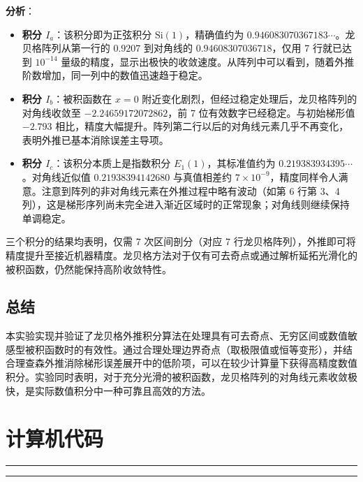 \documentclass[12pt,a4paper]{article}
\begin{document}
\textbf{分析}：
\begin{itemize}
    \item \textbf{积分 \(I_a\)}：该积分即为正弦积分 \(\mathrm{Si}(1)\)，精确值约为 \(0.946083070367183\cdots\)。龙贝格阵列从第一行的 \(0.9207\) 到对角线的 \(0.94608307036718\)，仅用 7 行就已达到 \(10^{-14}\) 量级的精度，显示出极快的收敛速度。从阵列中可以看到，随着外推阶数增加，同一列中的数值迅速趋于稳定。
    \item \textbf{积分 \(I_b\)}：被积函数在 \(x=0\) 附近变化剧烈，但经过稳定处理后，龙贝格阵列的对角线收敛至 \(-2.24659172072862\)，前 7 位有效数字已经稳定。与初始梯形值 \(-2.793\) 相比，精度大幅提升。阵列第二行以后的对角线元素几乎不再变化，表明外推已基本消除误差主导项。
    \item \textbf{积分 \(I_c\)}：该积分本质上是指数积分 \(E_1(1)\)，其标准值约为 \(0.219383934395\cdots\)。对角线近似值 \(0.21938394142680\) 与真值相差约 \(7\times10^{-9}\)，精度同样令人满意。注意到阵列的非对角线元素在外推过程中略有波动（如第 6 行第 3、4 列），这是梯形序列尚未完全进入渐近区域时的正常现象；对角线则继续保持单调稳定。
\end{itemize}

三个积分的结果均表明，仅需 7 次区间剖分（对应 7 行龙贝格阵列），外推即可将精度提升至接近机器精度。龙贝格方法对于仅有可去奇点或通过解析延拓光滑化的被积函数，仍然能保持高阶收敛特性。

\subsection{总结}

本实验实现并验证了龙贝格外推积分算法在处理具有可去奇点、无穷区间或数值敏感型被积函数时的有效性。通过合理处理边界奇点（取极限值或恒等变形），并结合理查森外推消除梯形误差展开中的低阶项，可以在较少计算量下获得高精度数值积分。实验同时表明，对于充分光滑的被积函数，龙贝格阵列的对角线元素收敛极快，是实际数值积分中一种可靠且高效的方法。

\newpage
\section{计算机代码}

\small
\hrule

\hrule
\end{document}
